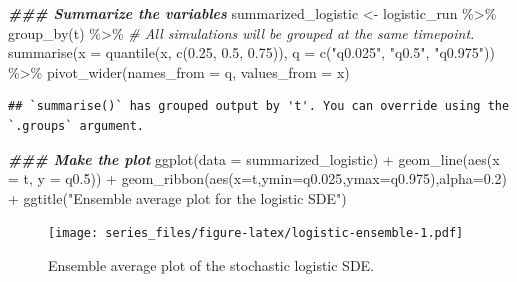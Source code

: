 \documentclass[
]{book}
\newenvironment{Shaded}{\begin{snugshade}}{\end{snugshade}}
\newcommand{\AttributeTok}[1]{\textcolor[rgb]{0.77,0.63,0.00}{#1}}
\newcommand{\CommentTok}[1]{\textcolor[rgb]{0.56,0.35,0.01}{\textit{#1}}}
\newcommand{\DocumentationTok}[1]{\textcolor[rgb]{0.56,0.35,0.01}{\textbf{\textit{#1}}}}
\newcommand{\FloatTok}[1]{\textcolor[rgb]{0.00,0.00,0.81}{#1}}
\newcommand{\FunctionTok}[1]{\textcolor[rgb]{0.00,0.00,0.00}{#1}}
\newcommand{\NormalTok}[1]{#1}
\newcommand{\OtherTok}[1]{\textcolor[rgb]{0.56,0.35,0.01}{#1}}
\newcommand{\SpecialCharTok}[1]{\textcolor[rgb]{0.00,0.00,0.00}{#1}}
\newcommand{\StringTok}[1]{\textcolor[rgb]{0.31,0.60,0.02}{#1}}
\theoremstyle{definition}
\theoremstyle{definition}
\theoremstyle{definition}
\theoremstyle{remark}
\begin{document}
\begin{Shaded}
\begin{Highlighting}[]
\DocumentationTok{\#\#\# Summarize the variables}
\NormalTok{summarized\_logistic }\OtherTok{\textless{}{-}}\NormalTok{ logistic\_run }\SpecialCharTok{\%\textgreater{}\%}
  \FunctionTok{group\_by}\NormalTok{(t) }\SpecialCharTok{\%\textgreater{}\%}  \CommentTok{\# All simulations will be grouped at the same timepoint.}
  \FunctionTok{summarise}\NormalTok{(}\AttributeTok{x =} \FunctionTok{quantile}\NormalTok{(x, }\FunctionTok{c}\NormalTok{(}\FloatTok{0.25}\NormalTok{, }\FloatTok{0.5}\NormalTok{, }\FloatTok{0.75}\NormalTok{)), }\AttributeTok{q =} \FunctionTok{c}\NormalTok{(}\StringTok{"q0.025"}\NormalTok{, }\StringTok{"q0.5"}\NormalTok{, }\StringTok{"q0.975"}\NormalTok{)) }\SpecialCharTok{\%\textgreater{}\%}
  \FunctionTok{pivot\_wider}\NormalTok{(}\AttributeTok{names\_from =}\NormalTok{ q, }\AttributeTok{values\_from =}\NormalTok{ x)}
\end{Highlighting}
\end{Shaded}

\begin{verbatim}
## `summarise()` has grouped output by 't'. You can override using the `.groups` argument.
\end{verbatim}

\begin{Shaded}
\begin{Highlighting}[]
\DocumentationTok{\#\#\# Make the plot}
\FunctionTok{ggplot}\NormalTok{(}\AttributeTok{data =}\NormalTok{ summarized\_logistic) }\SpecialCharTok{+}
  \FunctionTok{geom\_line}\NormalTok{(}\FunctionTok{aes}\NormalTok{(}\AttributeTok{x =}\NormalTok{ t, }\AttributeTok{y =}\NormalTok{ q0}\FloatTok{.5}\NormalTok{)) }\SpecialCharTok{+}
  \FunctionTok{geom\_ribbon}\NormalTok{(}\FunctionTok{aes}\NormalTok{(}\AttributeTok{x=}\NormalTok{t,}\AttributeTok{ymin=}\NormalTok{q0}\FloatTok{.025}\NormalTok{,}\AttributeTok{ymax=}\NormalTok{q0}\FloatTok{.975}\NormalTok{),}\AttributeTok{alpha=}\FloatTok{0.2}\NormalTok{) }\SpecialCharTok{+}
  \FunctionTok{ggtitle}\NormalTok{(}\StringTok{"Ensemble average plot for the logistic SDE"}\NormalTok{)}
\end{Highlighting}
\end{Shaded}

\begin{figure}
\centering
\texttt{[image: series\_files/figure-latex/logistic-ensemble-1.pdf]}
\caption{\label{fig:logistic-ensemble}Ensemble average plot of the stochastic logistic SDE.}
\end{figure}
\end{document}
